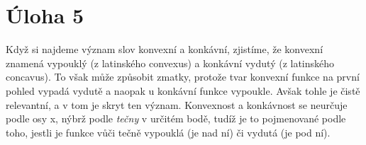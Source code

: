 \documentclass{fkssolpub}
\author{Ondřej Sedláček}
\begin{document}
 

\section{Úloha 5}

Když si najdeme význam slov konvexní a konkávní, zjistíme, že konvexní znamená
vypouklý (z latinského convexus) a konkávní vydutý (z latinského concavus). 
To však může způsobit zmatky, protože tvar konvexní funkce na první pohled 
vypadá vydutě a naopak u konkávní funkce vypoukle. Avšak tohle je čistě
relevantní, a v tom je skryt ten význam. Konvexnost a konkávnost se neurčuje
podle osy x, nýbrž podle \textit{tečny} v určitém bodě, tudíž je to pojmenované
podle toho, jestli je funkce vůči tečně vypouklá (je nad ní) či vydutá
(je pod ní).
\end{document}
